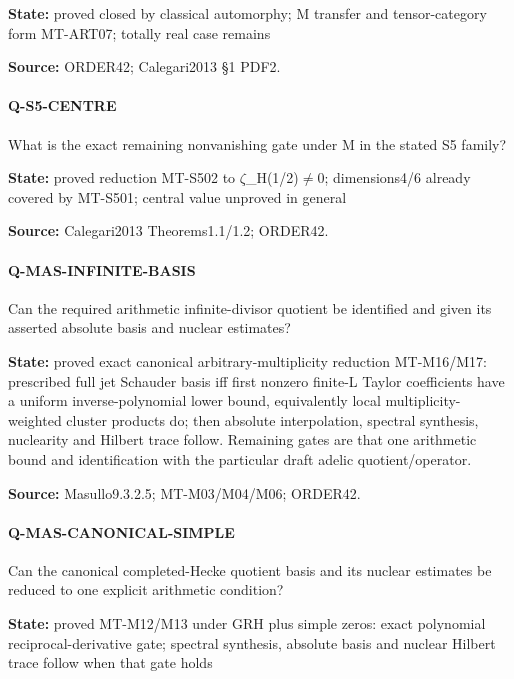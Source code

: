 \documentclass[11pt,a4paper]{article}
\begin{document}
\textbf{State:} proved closed by classical automorphy; M transfer and tensor-category form MT-ART07; totally real case remains

\textbf{Source:} ORDER42; Calegari2013 §1 PDF2.

\paragraph{Q-S5-CENTRE} What is the exact remaining nonvanishing gate under M in the stated S5 family?

\textbf{State:} proved reduction MT-S502 to \ensuremath{\zeta}\_\allowbreak{}H(1/\allowbreak{}2)\ensuremath{\ne}0; dimensions4/\allowbreak{}6 already covered by MT-S501; central value unproved in general

\textbf{Source:} Calegari2013 Theorems1.\allowbreak{}1/\allowbreak{}1.\allowbreak{}2; ORDER42.

\paragraph{Q-MAS-INFINITE-BASIS} Can the required arithmetic infinite-divisor quotient be identified and given its asserted absolute basis and nuclear estimates?

\textbf{State:} proved exact canonical arbitrary-multiplicity reduction MT-M16/\allowbreak{}M17:\allowbreak{} prescribed full jet Schauder basis iff first nonzero finite-L Taylor coefficients have a uniform inverse-polynomial lower bound, equivalently local multiplicity-weighted cluster products do; then absolute interpolation, spectral synthesis, nuclearity and Hilbert trace follow.\allowbreak{} Remaining gates are that one arithmetic bound and identification with the particular draft adelic quotient/\allowbreak{}operator.\allowbreak{}

\textbf{Source:} Masullo9.\allowbreak{}3.\allowbreak{}2.\allowbreak{}5; MT-M03/\allowbreak{}M04/\allowbreak{}M06; ORDER42.

\paragraph{Q-MAS-CANONICAL-SIMPLE} Can the canonical completed-Hecke quotient basis and its nuclear estimates be reduced to one explicit arithmetic condition?

\textbf{State:} proved MT-M12/\allowbreak{}M13 under GRH plus simple zeros:\allowbreak{} exact polynomial reciprocal-derivative gate; spectral synthesis, absolute basis and nuclear Hilbert trace follow when that gate holds
\end{document}
